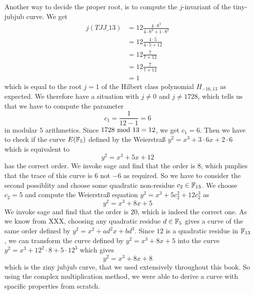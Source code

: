 \begin{example}
Another way to decide the proper root, is to compute the $j$-invariant of the tiny-jubjub curve. We get
\begin{align*}
j(\mathit{TJJ\_13}) & = 12\frac{4\cdot 8^3}{4\cdot 8^3+ 1\cdot 8^2}\\
                    & = 12\frac{4\cdot 5}{4\cdot 5+ 12}\\
                    & = 12\frac{7}{7+ 12}\\
                    & = 12\frac{7}{7+ 12}\\
                    & = 1
\end{align*}
which is equal to the root $j=1$ of the Hilbert class polynomial $H_{-16,13}$ as expected. We therefore have a situation with $j\neq 0$ and $j\neq 1728$, which tells us that we have to compute the parameter
$$
c_1=\frac{1}{12-1} = 6
$$
in modular $5$ arithmetics. Since $1728 \text{ mod } 13=12$, we get $c_1=6$. Then we have to check if the curve $E(\mathbb{F}_5)$ defined by the Weierstraß  $y^2 = x^3 + 3\cdot 6 x + 2\cdot 6$ which is equivalent to
$$
y^2 = x^3 + 5x +12
$$ has the correct order. We invoke sage and find that the order is $8$, which pmplies that the trace of this curve is $6$ not $-6$ as required. So we have to consider the second possiblity and choose some quadratic non-residue $c_2\in\mathbb{F}_{13}$. We choose $c_2=5$ and compute the Weierstraß equation $y^2 = x^3 + 5 c_2^2 + 12 c_2^3$ as
$$
y^2 = x^3 + 8 x + 5
$$
We invoke sage and find that the order is $20$, which is indeed the correct one. As we know from XXX, choosing any quadratic residue $d\in \mathbb{F}_5$ gives a curve of the same order defined by $y^2 = x^2 + a d^2 x + bd^3$. Since $12$ is a quadratic residue in $\mathbb{F}_{13}$, we can transform the curve defined by
$y^2 = x^3 +8x+5$ into the curve $y^2 = x^3 + 12^2\cdot 8 + 5\cdot 12^3$ which gives
$$
y^2 = x^3 + 8x +8
$$
which is the ziny jubjub curve, that we used extensively throughout this book. So using the complex multiplication method, we were able to derive a curve with spacific properties from scratch.
\end{example}
